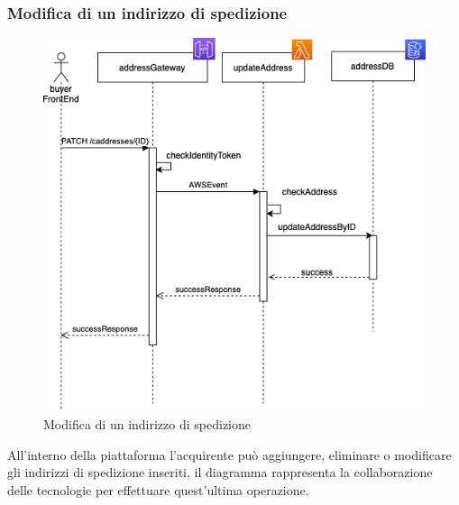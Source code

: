 \subsubsection{Modifica di un indirizzo di spedizione}
\begin{figure}[H]
	\centering
	\includegraphics[scale=0.5]{Immagini/Backend/ModificaIndirizzo.png}
	\caption{Modifica di un indirizzo di spedizione}
	\label{fig:DiagrammaModificaindirizzo}
\end{figure}
All'interno della piattaforma l'acquirente può aggiungere, eliminare o modificare gli indirizzi di spedizione inseriti, il diagramma rappresenta la collaborazione delle tecnologie per effettuare quest'ultima operazione.
